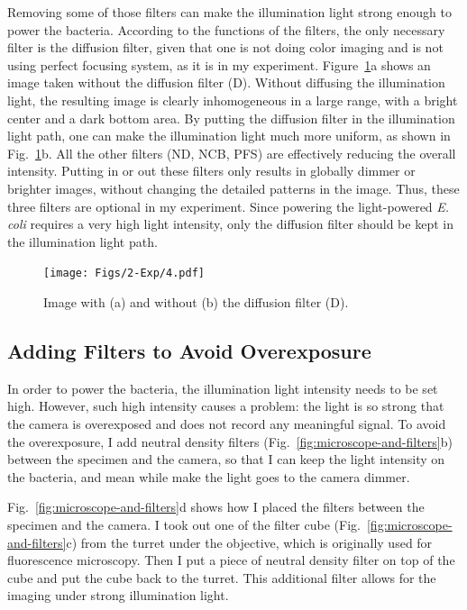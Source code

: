 Removing some of those filters can make the illumination light strong enough to power the bacteria. According to the functions of the filters, the only necessary filter is the diffusion filter, given that one is not doing color imaging and is not using perfect focusing system, as it is in my experiment. Figure~\ref{fig:2-4}a shows an image taken without the diffusion filter (D). Without diffusing the illumination light, the resulting image is clearly inhomogeneous in a large range, with a bright center and a dark bottom area. By putting the diffusion filter in the illumination light path, one can make the illumination light much more uniform, as shown in Fig.~\ref{fig:2-4}b. All the other filters (ND, NCB, PFS) are effectively reducing the overall intensity. Putting in or out these filters only results in globally dimmer or brighter images, without changing the detailed patterns in the image. Thus, these three filters are optional in my experiment. Since powering the light-powered \textit{E. coli} requires a very high light intensity, only the diffusion filter should be kept in the illumination light path.

\begin{figure}[!]
	\begin{center}
	\texttt{[image: Figs/2-Exp/4.pdf]}
	\end{center}
	\caption[Diffusion Filter Function Illustration]
	{
	Image with (a) and without (b) the diffusion filter (D).
	}
	\label{fig:2-4}
\end{figure}

\subsection{Adding Filters to Avoid Overexposure}

In order to power the bacteria, the illumination light intensity needs to be set high. However, such high intensity causes a problem: the light is so strong that the camera is overexposed and does not record any meaningful signal. To avoid the overexposure, I add neutral density filters (Fig.~\ref{fig:microscope-and-filters}b) between the specimen and the camera, so that I can keep the light intensity on the bacteria, and mean while make the light goes to the camera dimmer.

Fig.~\ref{fig:microscope-and-filters}d shows how I placed the filters between the specimen and the camera. I took out one of the filter cube (Fig.~\ref{fig:microscope-and-filters}c) from the turret under the objective, which is originally used for fluorescence microscopy. Then I put a piece of neutral density filter on top of the cube and put the cube back to the turret. This additional filter allows for the imaging under strong illumination light.

